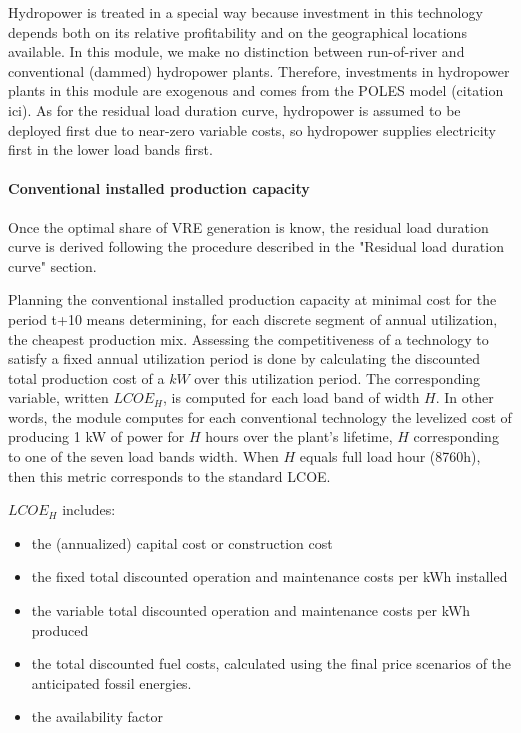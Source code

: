 Hydropower is treated in a special way because investment in this technology depends both on its relative profitability and on the  geographical locations available.
In this module, we make no distinction between run-of-river and conventional (dammed) hydropower plants. Therefore, investments in hydropower plants in this module are exogenous and comes from the POLES model (citation ici).
As for the residual load duration curve, hydropower is assumed to be deployed first due to near-zero variable costs, so hydropower supplies electricity first in the lower load bands first.


\paragraph{Conventional installed production capacity}

Once the optimal share of VRE generation is know, the residual load duration curve is derived following the procedure described in the "Residual load duration curve" section.



Planning the conventional installed production capacity at minimal cost for the period t+10 means determining, for each discrete segment of annual utilization, the cheapest production mix.
Assessing the competitiveness of a technology to satisfy a fixed annual utilization period is done by calculating the discounted total production cost of a
$kW$ over this utilization period.
The corresponding variable, written $LCOE_{H}$, is computed for each load band of width $H$. In other words, the module computes for each conventional technology the levelized cost of producing 1 kW of power for $H$ hours over the plant's lifetime, $H$ corresponding to one of the seven load bands width. When $H$ equals full load hour (8760h), then this metric corresponds to the standard LCOE.

$LCOE_{H}$ includes:

\begin{itemize}
    \item the (annualized) capital cost or construction cost
    \item the fixed total discounted operation and maintenance costs per kWh installed
    \item the variable total discounted operation and maintenance costs per kWh produced
    \item the total discounted fuel costs, calculated using the final price scenarios of the anticipated fossil energies.
    \item  the availability factor
\end{itemize}



